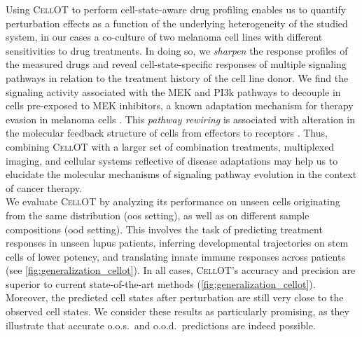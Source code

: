 Using \textsc{CellOT} to perform cell-state-aware drug profiling enables us to quantify perturbation effects as a function of the underlying heterogeneity of the studied system, in our cases a co-culture of two melanoma cell lines with different sensitivities to drug treatments. In doing so, we \textit{sharpen} the response profiles of the measured drugs and reveal cell-state-specific responses of multiple signaling pathways in relation to the treatment history of the cell line donor. We find the signaling activity associated with the MEK and PI3k pathways to decouple in cells pre-exposed to MEK inhibitors, a known adaptation mechanism for therapy evasion in melanoma cells \citep{kun2021mek}. This \textit{pathway rewiring} is associated with alteration in the molecular feedback structure of cells from effectors to receptors \citep{kun2021mek, turke2012mek}. Thus, combining \textsc{CellOT} with a larger set of combination treatments, multiplexed imaging, and cellular systems reflective of disease adaptations may help us to elucidate the molecular mechanisms of signaling pathway evolution in the context of cancer therapy. \\

We evaluate \textsc{CellOT} by analyzing its performance on unseen cells originating from the same distribution (\acrshort{oos} setting), as well as on different sample compositions (\acrshort{ood} setting). 
This involves the task of predicting treatment responses in unseen lupus patients, inferring developmental trajectories on stem cells of lower potency, and translating innate immune responses across patients (see \cref{fig:generalization_cellot}). 
In all cases, \textsc{CellOT}'s accuracy and precision are superior to current state-of-the-art methods (\cref{fig:generalization_cellot}). Moreover, the predicted cell states after perturbation are still very close to the observed cell states. We consider these results as particularly promising, as they illustrate that accurate o.o.s.~and o.o.d.~predictions are indeed possible. \\

